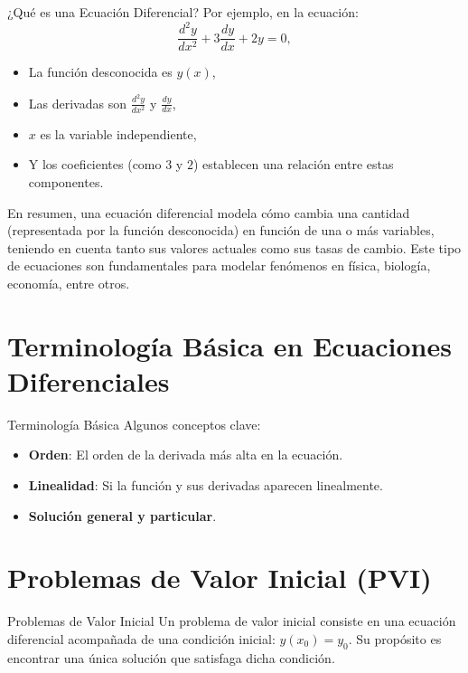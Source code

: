 \documentclass{beamer}
\begin{document}
\begin{frame}{¿Qué es una Ecuación Diferencial?}
Por ejemplo, en la ecuación:
\[
\frac{d^2y}{dx^2} + 3\frac{dy}{dx} + 2y = 0,
\]
\begin{itemize}
    \item La función desconocida es \( y(x) \),
    \item Las derivadas son \( \frac{d^2y}{dx^2} \) y \( \frac{dy}{dx} \),
    \item \( x \) es la variable independiente,
    \item Y los coeficientes (como \( 3 \) y \( 2 \)) establecen una relación entre estas componentes.
\end{itemize}
En resumen, una ecuación diferencial modela cómo cambia una cantidad (representada por la función desconocida) en función de una o más variables, teniendo en cuenta tanto sus valores actuales como sus tasas de cambio.
Este tipo de ecuaciones son fundamentales para modelar fenómenos en física, biología, economía, entre otros.
\end{frame}

\section{Terminología Básica en Ecuaciones Diferenciales}
\begin{frame}{Terminología Básica}
Algunos conceptos clave:
\begin{itemize}
  \item \textbf{Orden}: El orden de la derivada más alta en la ecuación.
  \item \textbf{Linealidad}: Si la función y sus derivadas aparecen linealmente.
  \item \textbf{Solución general y particular}.
\end{itemize}
\end{frame}

\section{Problemas de Valor Inicial (PVI)}
\begin{frame}{Problemas de Valor Inicial}
Un problema de valor inicial consiste en una ecuación diferencial acompañada de una condición inicial: $y(x_0) = y_0$. Su propósito es encontrar una única solución que satisfaga dicha condición.
\end{frame}
\end{document}

